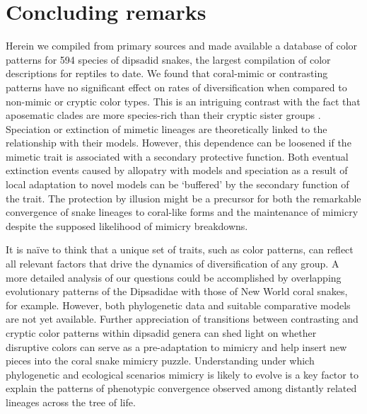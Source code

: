 \section{Concluding remarks}

Herein we compiled from primary sources and made available a database of color patterns for 594 species of dipsadid snakes, the largest compilation of color descriptions for reptiles to date. We found that coral-mimic or contrasting patterns have no significant effect on rates of diversification when compared to non-mimic or cryptic color types. This is an intriguing contrast with the fact that aposematic clades are more species-rich than their cryptic sister groups \citep{przeczek_2008}. Speciation or extinction of mimetic lineages are theoretically linked to the relationship with their models. However, this dependence can be loosened if the mimetic trait is associated with a secondary protective function. Both eventual extinction events caused by allopatry with models and speciation as a result of local adaptation to novel models can be `buffered' by the secondary function of the trait. The protection by illusion might be a precursor for both the remarkable convergence of snake lineages to coral-like forms and the maintenance of mimicry despite the supposed likelihood of mimicry breakdowns.

It is naïve to think that a unique set of traits, such as color patterns, can reflect all relevant factors that drive the dynamics of diversification of any group. A more detailed analysis of our questions could be accomplished by overlapping evolutionary patterns of the Dipsadidae with those of New World coral snakes, for example. However, both phylogenetic data and suitable comparative models are not yet available. Further appreciation of transitions between contrasting and cryptic color patterns within dipsadid genera can shed light on whether disruptive colors can serve as a pre-adaptation to mimicry and help insert new pieces into the coral snake mimicry puzzle. Understanding under which phylogenetic and ecological scenarios mimicry is likely to evolve is a key factor to explain the patterns of phenotypic convergence observed among distantly related lineages across the tree of life.

\pagebreak

